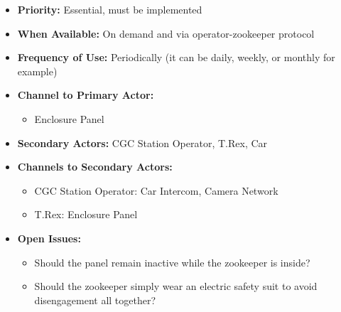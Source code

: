 \documentclass[12pt]{article}
\begin{document}
\begin{itemize}
        \item[]\textbf{Priority:}
            Essential, must be implemented

        \item[]\textbf{When Available:}
            On demand and via operator-zookeeper protocol

        \item[]\textbf{Frequency of Use:}
            Periodically (it can be daily, weekly, or monthly for example)

        \item[]\textbf{Channel to Primary Actor:}
            \begin{itemize}
                \item[] Enclosure Panel
            \end{itemize}

        \item[]\textbf{Secondary Actors:}
            CGC Station Operator, T.Rex, Car
        
        \item[]\textbf{Channels to Secondary Actors:}
            \begin{itemize}
                \item[] CGC Station Operator: Car Intercom, Camera Network
                \item[] T.Rex: Enclosure Panel
            \end{itemize}

        \item[]\textbf{Open Issues:}
            \begin{itemize}
                \item[] Should the panel remain inactive while 
                the zookeeper is inside?
                \item[] Should the zookeeper simply wear an electric 
                safety suit to avoid disengagement all together?
            \end{itemize}
    \end{itemize}
\end{document}
